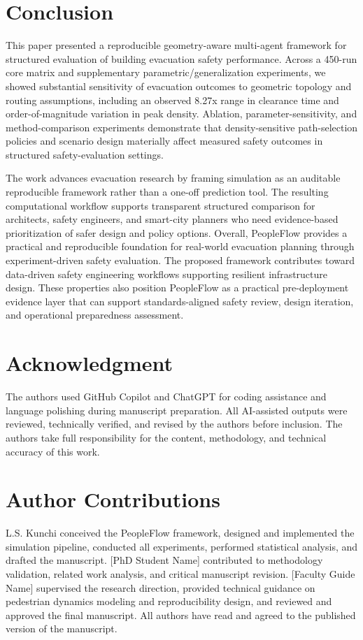 \documentclass[journal]{IEEEtran}
\begin{document}
\section{Conclusion}
This paper presented a reproducible geometry-aware multi-agent framework for structured evaluation of building evacuation safety performance. Across a 450-run core matrix and supplementary parametric/generalization experiments, we showed substantial sensitivity of evacuation outcomes to geometric topology and routing assumptions, including an observed 8.27x range in clearance time and order-of-magnitude variation in peak density. Ablation, parameter-sensitivity, and method-comparison experiments demonstrate that density-sensitive path-selection policies and scenario design materially affect measured safety outcomes in structured safety-evaluation settings.

The work advances evacuation research by framing simulation as an auditable reproducible framework rather than a one-off prediction tool. The resulting computational workflow supports transparent structured comparison for architects, safety engineers, and smart-city planners who need evidence-based prioritization of safer design and policy options. Overall, PeopleFlow provides a practical and reproducible foundation for real-world evacuation planning through experiment-driven safety evaluation.
The proposed framework contributes toward data-driven safety engineering workflows supporting resilient infrastructure design.
These properties also position PeopleFlow as a practical pre-deployment evidence layer that can support standards-aligned safety review, design iteration, and operational preparedness assessment.

\clearpage
\section*{Acknowledgment}
The authors used GitHub Copilot and ChatGPT for coding assistance and language polishing during manuscript preparation. All AI-assisted outputs were reviewed, technically verified, and revised by the authors before inclusion. The authors take full responsibility for the content, methodology, and technical accuracy of this work.

\FloatBarrier
{\scriptsize


}

\clearpage
\section*{Author Contributions}
L.S. Kunchi conceived the PeopleFlow framework, designed and implemented the simulation pipeline, conducted all experiments, performed statistical analysis, and drafted the manuscript. [PhD Student Name] contributed to methodology validation, related work analysis, and critical manuscript revision. [Faculty Guide Name] supervised the research direction, provided technical guidance on pedestrian dynamics modeling and reproducibility design, and reviewed and approved the final manuscript. All authors have read and agreed to the published version of the manuscript.
\end{document}
